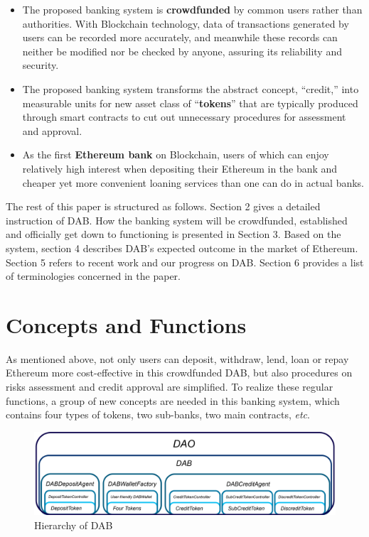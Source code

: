 \documentclass[review]{elsarticle}
\begin{document}
\begin{itemize}
   \item The proposed banking system is \textbf{crowdfunded} by common users rather than authorities. With Blockchain technology, data of transactions generated by users can be recorded more accurately, and meanwhile these records can neither be modified nor be checked by anyone, assuring its reliability and security.
   \item The proposed banking system transforms the abstract concept, ``credit,'' into measurable units for new asset class of ``\textbf{tokens}'' that are typically produced through smart contracts to cut out unnecessary procedures for assessment and approval.
   \item As the first \textbf{Ethereum bank} on Blockchain, users of which can enjoy relatively high interest when depositing their Ethereum in the bank and cheaper yet more convenient loaning services than one can do in actual banks.
\end{itemize}

The rest of this paper is structured as follows. Section 2 gives a detailed instruction of DAB. How the banking system will be crowdfunded, established and officially get down to functioning is presented in Section 3. Based on the system, section 4 describes DAB's expected outcome in the market of Ethereum. Section 5 refers to recent work and our progress on DAB. Section 6 provides a list of terminologies concerned in the paper.

\section{Concepts and Functions}
As mentioned above, not only users can deposit, withdraw, lend, loan or repay Ethereum more cost-effective in this crowdfunded DAB, but also procedures on risks assessment and credit approval are simplified. To realize these regular functions, a group of new concepts are needed in this banking system, which contains four types of tokens, two sub-banks, two main contracts, \emph{etc}.

\begin{figure}[H]
\begin{center}
\includegraphics[width=4.5in]{Graphs/DAB_Hierarchy.jpg}
\end{center}
\caption{Hierarchy of DAB}\label{HoD}
\end{figure}
\end{document}
